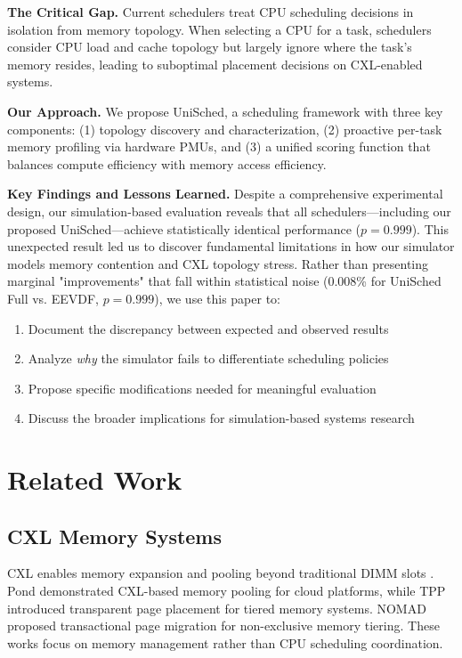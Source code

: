 \documentclass[11pt]{article}
\begin{document}
\textbf{The Critical Gap.} Current schedulers treat CPU scheduling decisions in isolation from memory topology. When selecting a CPU for a task, schedulers consider CPU load and cache topology but largely ignore where the task's memory resides, leading to suboptimal placement decisions on CXL-enabled systems.

\textbf{Our Approach.} We propose UniSched, a scheduling framework with three key components: (1) topology discovery and characterization, (2) proactive per-task memory profiling via hardware PMUs, and (3) a unified scoring function that balances compute efficiency with memory access efficiency.

\textbf{Key Findings and Lessons Learned.} Despite a comprehensive experimental design, our simulation-based evaluation reveals that all schedulers---including our proposed UniSched---achieve statistically identical performance ($p=0.999$). This unexpected result led us to discover fundamental limitations in how our simulator models memory contention and CXL topology stress. Rather than presenting marginal "improvements" that fall within statistical noise (0.008\% for UniSched Full vs. EEVDF, $p=0.999$), we use this paper to:

\begin{enumerate}
    \item Document the discrepancy between expected and observed results
    \item Analyze \textit{why} the simulator fails to differentiate scheduling policies
    \item Propose specific modifications needed for meaningful evaluation
    \item Discuss the broader implications for simulation-based systems research
\end{enumerate}

\section{Related Work}

\subsection{CXL Memory Systems}

CXL enables memory expansion and pooling beyond traditional DIMM slots \citep{li2023pond}. Pond \citep{li2023pond} demonstrated CXL-based memory pooling for cloud platforms, while TPP \citep{almaruf2023tpp} introduced transparent page placement for tiered memory systems. NOMAD \citep{xiang2024nomad} proposed transactional page migration for non-exclusive memory tiering. These works focus on memory management rather than CPU scheduling coordination.
\end{document}
